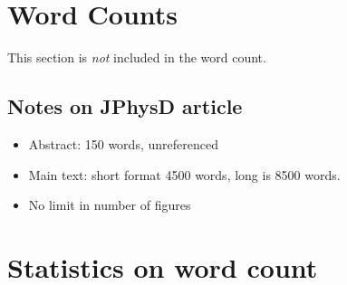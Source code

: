 \section*{Word Counts}
This section is \textit{not} included in the word count.



\subsection*{Notes on JPhysD article}
\begin{itemize}
    \item Abstract: 150 words, unreferenced
    \item Main text: short format 4500 words, long is 8500 words.
    \item No limit in number of figures
\end{itemize}

\section*{Statistics on word count}

\immediate{}

